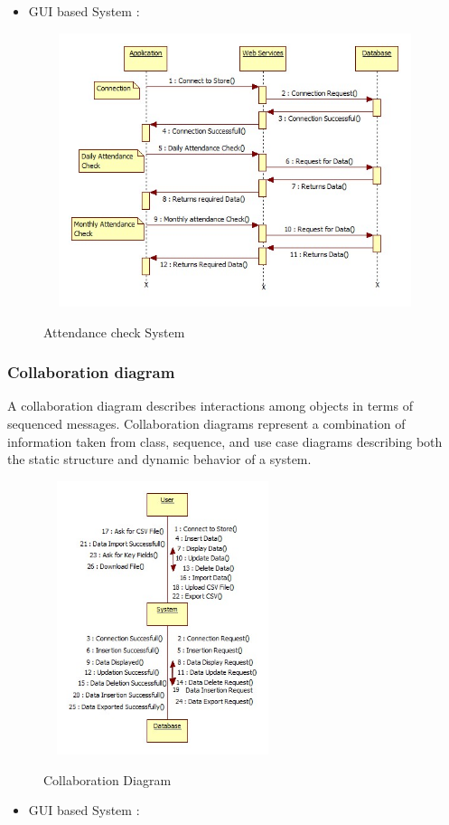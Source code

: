 \newpage
\begin{itemize}
  \item GUI based  System :
\end{itemize}
\begin{figure}[h]
\centering
  \includegraphics[width=13cm,height=8cm]{Fig14.jpg}\\
  \caption{Attendance check  System}
  \label{Attendance check  System}
\end{figure}

\newpage
\subsubsection{Collaboration diagram}
\hspace*{0.7in} A collaboration diagram describes interactions among objects in terms of sequenced messages. Collaboration diagrams represent a combination of information taken from class, sequence, and use case diagrams describing both the static structure and dynamic behavior of a system.

\begin{figure}[h]
\centering
  \includegraphics[width=7cm,height=8cm]{Fig15.jpg}\\
  \caption{Collaboration Diagram}
  \label{Collaboration Diagram}
\end{figure}
\newpage
\begin{itemize}
  \item GUI based  System :
\end{itemize}

